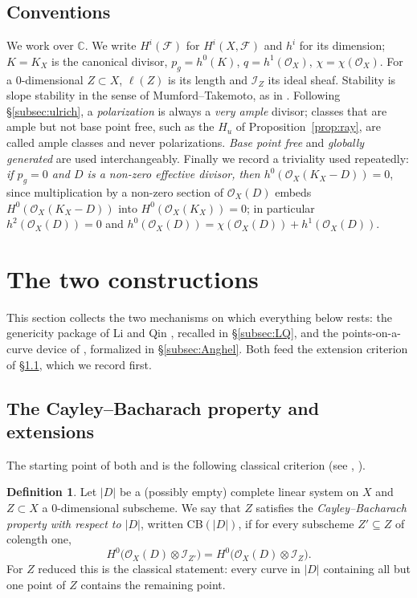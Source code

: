 \documentclass{amsart}
\theoremstyle{definition}
\newtheorem{definition}[theorem]{Definition}
\newcommand{\OO}{\mathcal{O}}
\newcommand{\FF}{\mathcal{F}}
\newcommand{\II}{\mathcal{I}}
\newcommand{\CC}{\mathbb{C}}
\newcommand{\len}{\ell}
\begin{document}
\subsection*{Conventions}
We work over $\CC$. We write $H^i(\FF)$ for $H^i(X,\FF)$ and $h^i$ for its dimension; $K=K_X$ is the canonical divisor, $p_g=h^0(K)$, $q=h^1(\OO_X)$, $\chi=\chi(\OO_X)$. For a $0$-dimensional $Z\subset X$, $\len(Z)$ is its length and $\II_Z$ its ideal sheaf. Stability is slope stability in the sense of Mumford--Takemoto, as in \cite{LQ94}. Following \S\ref{subsec:ulrich}, a \emph{polarization} is always a \emph{very ample} divisor; classes that are ample but not base point free, such as the $H_u$ of Proposition~\ref{prop:ray}, are called ample classes and never polarizations. \emph{Base point free} and \emph{globally generated} are used interchangeably. Finally we record a triviality used repeatedly: \emph{if $p_g=0$ and $D$ is a non-zero effective divisor, then $h^0(\OO_X(K_X-D))=0$}, since multiplication by a non-zero section of $\OO_X(D)$ embeds $H^0(\OO_X(K_X-D))$ into $H^0(\OO_X(K_X))=0$; in particular $h^2(\OO_X(D))=0$ and $h^0(\OO_X(D))=\chi(\OO_X(D))+h^1(\OO_X(D))$.

\section{The two constructions}\label{sec:methods}

This section collects the two mechanisms on which everything below rests: the genericity package of Li and Qin \cite{LQ94}, recalled in \S\ref{subsec:LQ}, and the points-on-a-curve device of \cite{An94}, formalized in \S\ref{subsec:Anghel}. Both feed the extension criterion of \S\ref{subsec:CB}, which we record first.

\subsection{The Cayley--Bacharach property and extensions}\label{subsec:CB}
The starting point of both \cite{LQ94} and \cite{An94} is the following classical criterion (see \cite[p.~731]{GH78book}, \cite[Prop.~2.2]{LQ94}).

\begin{definition}\label{def:CB}
Let $|D|$ be a (possibly empty) complete linear system on $X$ and $Z\subset X$ a $0$-dimensional subscheme. We say that $Z$ satisfies the \emph{Cayley--Bacharach property with respect to $|D|$}, written CB$(|D|)$, if for every subscheme $Z'\subseteq Z$ of colength one,
\[
H^0\bigl(\OO_X(D)\otimes\II_{Z'}\bigr)=H^0\bigl(\OO_X(D)\otimes\II_{Z}\bigr).
\]
For $Z$ reduced this is the classical statement: every curve in $|D|$ containing all but one point of $Z$ contains the remaining point.
\end{definition}
\end{document}
